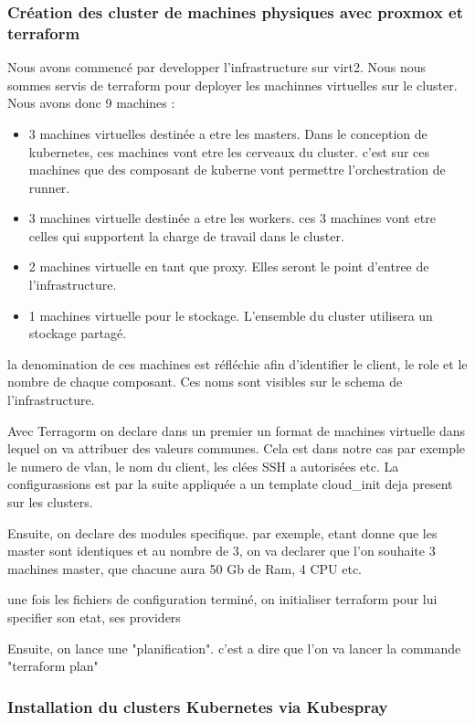 \documentclass[12pt]{article}
\begin{document}
\subsubsection{Création des cluster de machines physiques avec proxmox et  terraform}
Nous avons commencé par developper l'infrastructure sur virt2. Nous nous sommes servis de terraform pour deployer les machinnes virtuelles sur le cluster. Nous avons donc 9 machines :

\begin{itemize}
    \item 3 machines virtuelles destinée a etre les masters. Dans le conception de kubernetes, ces machines vont etre les cerveaux du cluster. c'est sur ces machines que des composant de kuberne vont permettre l'orchestration de runner.
    \item 3 machines virtuelle destinée a etre les workers. ces 3 machines vont etre celles qui supportent la charge de travail dans le cluster.
    \item 2 machines virtuelle en tant que proxy. Elles seront le point d'entree de l'infrastructure. 
    \item 1 machines virtuelle pour le stockage. L'ensemble du cluster utilisera un stockage partagé.
\end{itemize}

la denomination de ces machines est réfléchie afin d'identifier le client, le role et le nombre de chaque composant. Ces noms sont visibles sur le schema de l'infrastructure.

Avec Terragorm on declare dans un premier un format de machines virtuelle dans lequel on va attribuer des valeurs communes. Cela est dans notre cas par exemple le numero de vlan, le nom du client, les clées SSH a autorisées etc. La configurassions est par la suite appliquée a un template cloud\_init deja present sur les clusters.

Ensuite, on declare des modules specifique. par exemple, etant donne que les master sont identiques et au nombre de 3, on va declarer que l'on souhaite 3 machines master, que chacune aura 50 Gb de Ram, 4 CPU etc. 

une fois les fichiers de configuration terminé, on initialiser terraform pour lui specifier son etat, ses providers 

Ensuite, on lance une "planification". c'est a dire que l'on va lancer la commande "terraform plan"

\subsubsection{Installation du clusters Kubernetes via Kubespray}
\end{document}
